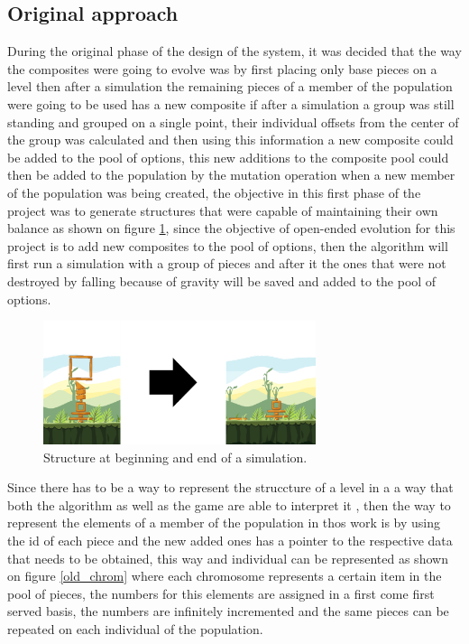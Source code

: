 \documentclass[conference]{IEEEtran}
\begin{document}
    \subsection{Original approach}
    During the original phase of the design of the system, it was decided that the way 
    the composites were going to evolve was by first placing only base pieces on a level 
    then after a simulation the remaining pieces
    of a member of the population were going to be used has a new composite if after a 
    simulation a group was still standing and grouped on a single point, their individual 
    offsets from the center of the group was calculated and then using this information a new 
    composite could be added to the pool of options, this new
    additions to the composite pool could then be added to the population by the mutation
    operation when a new member of the population was being created, the objective 
    in this first phase of the project was to generate
    structures that were capable of maintaining their own balance as shown on figure
    \ref{test_old}, since the objective of open-ended evolution for this project is
    to add new composites to the pool of options, then the algorithm will first run a
    simulation with a group of pieces and after it the ones that were not destroyed
    by falling because of gravity will be saved and added to the pool of options.
    
    
    
    \begin{figure}[htbp]
    \centerline{\includegraphics[width=80mm]{Images/simulation_bef_aft_example.png}}
    \caption{Structure at beginning and end of a simulation.}
    \label{test_old}
    \end{figure}
    
    Since there has to be a way to represent the struccture of a level in a a way that
    both the algorithm as well as the game are able to interpret it \cite{togelius2016Representationsforsearch-basedmethods}, 
    then the way to represent the elements of a member of the population in thos work 
    is by using the id of each piece and the new added ones has a pointer to the respective data
    that needs to be obtained, this way and individual can be represented as shown
    on figure \ref{old_chrom} where each chromosome represents a certain item in the
    pool of pieces, the numbers for this elements are assigned in a first come first
    served basis, the numbers are infinitely incremented and the same pieces can be
    repeated on each individual of the population.
    
\end{document}
